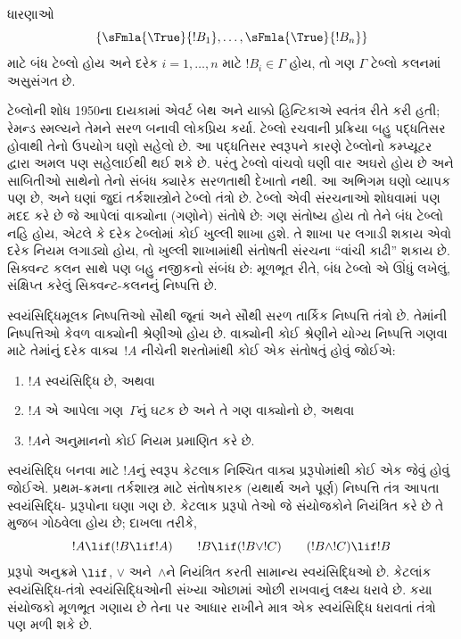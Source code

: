 ધારણાઓ
\[
\{\sFmla{\True}{!B_1}, \dots, \sFmla{\True}{!B_n}\}
\]
માટે બંધ ટેબ્લો હોય અને દરેક $i=1,\dots,n$ માટે
$!B_i\in\Gamma$ હોય, તો ગણ $\Gamma$ ટેબ્લો કલનમાં અસુસંગત છે.

ટેબ્લોની શોધ 1950ના દાયકામાં એવર્ટ બેથ અને યાક્કો હિન્ટિકાએ
સ્વતંત્ર રીતે કરી હતી; રેમન્ડ સ્મલ્યને તેમને સરળ બનાવી લોકપ્રિય કર્યા.
ટેબ્લો રચવાની પ્રક્રિયા બહુ પદ્ધતિસર હોવાથી તેનો ઉપયોગ ઘણો સહેલો
છે. આ પદ્ધતિસર સ્વરૂપને કારણે ટેબ્લોનો કમ્પ્યૂટર દ્વારા અમલ પણ
સહેલાઈથી થઈ શકે છે. પરંતુ ટેબ્લો વાંચવો ઘણી વાર અઘરો હોય છે અને
સાબિતીઓ સાથેનો તેનો સંબંધ ક્યારેક સરળતાથી દેખાતો નથી. આ અભિગમ ઘણો
વ્યાપક પણ છે, અને ઘણાં જુદાં તર્કશાસ્ત્રોને ટેબ્લો તંત્રો છે.
ટેબ્લો એવી સંરચનાઓ શોધવામાં પણ મદદ કરે છે જે આપેલાં
વાક્યોના (ગણોને) સંતોષે છે: ગણ સંતોષ્ય હોય તો તેને બંધ ટેબ્લો નહિ
હોય, એટલે કે દરેક ટેબ્લોમાં કોઈ ખુલ્લી શાખા હશે. તે શાખા પર
લગાડી શકાય એવો દરેક નિયમ લગાડ્યો હોય, તો ખુલ્લી શાખામાંથી સંતોષતી
સંરચના ``વાંચી કાઢી'' શકાય છે. સિક્વન્ટ કલન સાથે પણ બહુ નજીકનો
સંબંધ છે: મૂળભૂત રીતે, બંધ ટેબ્લો એ ઊંધું લખેલું, સંક્ષિપ્ત કરેલું
સિક્વન્ટ-કલનનું નિષ્પત્તિ છે.
\endgroup


\begingroup
\makeatletter{}\makeatother


\label{guunit:OLP-0068}


સ્વયંસિદ્ધિમૂલક નિષ્પત્તિઓ સૌથી જૂનાં અને સૌથી સરળ તાર્કિક
નિષ્પત્તિ તંત્રો છે. તેમાંની નિષ્પત્તિઓ કેવળ વાક્યોની
શ્રેણીઓ હોય છે. વાક્યોની કોઈ શ્રેણીને યોગ્ય નિષ્પત્તિ
ગણવા માટે તેમાંનું દરેક વાક્ય~$!A$ નીચેની શરતોમાંથી કોઈ એક
સંતોષતું હોવું જોઈએ:
\begin{enumerate}
\item $!A$ સ્વયંસિદ્ધિ છે, અથવા
\item $!A$ એ આપેલા ગણ~$\Gamma$નું ઘટક છે અને તે ગણ
  વાક્યોનો છે, અથવા
\item $!A$ને અનુમાનનો કોઈ નિયમ પ્રમાણિત કરે છે.
\end{enumerate}
સ્વયંસિદ્ધિ બનવા માટે $!A$નું સ્વરૂપ કેટલાક નિશ્ચિત વાક્ય
પ્રરૂપોમાંથી કોઈ એક જેવું હોવું જોઈએ. પ્રથમ-ક્રમના તર્કશાસ્ત્ર માટે
સંતોષકારક (યથાર્થ અને પૂર્ણ) નિષ્પત્તિ તંત્ર આપતા સ્વયંસિદ્ધિ-
પ્રરૂપોના ઘણા ગણ છે. કેટલાક પ્રરૂપો તેઓ જે સંયોજકોને નિયંત્રિત કરે છે
તે મુજબ ગોઠવેલા હોય છે; દાખલા તરીકે,
\[
!A \lif (!B \lif !A) \qquad !B \lif (!B \lor !C) \qquad (!B \land !C) \lif !B
\]
પ્રરૂપો અનુક્રમે $\lif$, $\lor$ અને~$\land$ને નિયંત્રિત કરતી સામાન્ય
સ્વયંસિદ્ધિઓ છે. કેટલાંક સ્વયંસિદ્ધિ-તંત્રો સ્વયંસિદ્ધિઓની સંખ્યા
ઓછામાં ઓછી રાખવાનું લક્ષ્ય ધરાવે છે. કયા સંયોજકો મૂળભૂત ગણાય છે તેના
પર આધાર રાખીને માત્ર એક સ્વયંસિદ્ધિ ધરાવતાં તંત્રો પણ મળી શકે છે.

